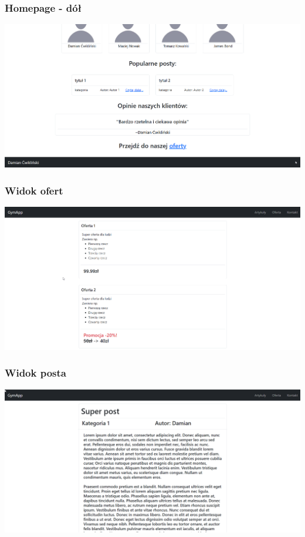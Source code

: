 \documentclass[12pt]{article}
\begin{document}
\subsubsection{Homepage - dół}
\includegraphics[width=1\textwidth, angle=0]{images/Interface_main2.png}
\subsubsection{Widok ofert}
\includegraphics[width=1\textwidth, angle=0]{images/Interface_offers.png}
\subsubsection{Widok posta}
\includegraphics[width=1\textwidth, angle=0]{images/Interface_post.png}
\end{document}
